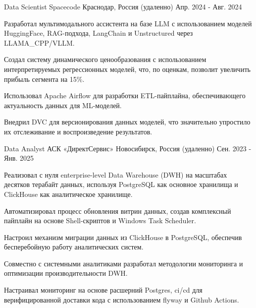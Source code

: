 \begin{cventries}
  \cventry
    {Data Scientist} %
    {Spacecode} %
    {Краснодар, Россия (удаленно)} %
    {Апр. 2024 - Авг. 2024} %
    {
      \begin{cvitems} %
        \item {Разработал мультимодального ассистента на базе LLM с использованием моделей HuggingFace, RAG-подхода, LangChain и Unstructured через LLAMA\_CPP/VLLM.}
        \item {Создал систему динамического ценообразования с использованием интерпретируемых регрессионных моделей, что, по оценкам, позволит увеличить прибыль сегмента на 15\%.}
        \item {Использовал Apache Airflow для разработки ETL-пайплайна, обеспечивающего актуальность данных для ML-моделей.}
        \item {Внедрил DVC для версионирования данных моделей, что значительно упростило их отслеживание и воспроизведение результатов.}
      \end{cvitems}
    }

  \cventry
    {Data Analyst} %
    {АСК «ДиректСервис»} %
    {Новосибирск, Россия (удаленно)} %
    {Сен. 2023 - Янв. 2025} %
    {
      \begin{cvitems} %
        \item {Реализовал с нуля enterprise-level Data Warehouse (DWH) на масштабах десятков терабайт данных, используя PostgreSQL как основное хранилища и ClickHouse как аналитическое хранилище.}
        \item {Автоматизировал процесс обновления витрин данных, создав комплексный пайплайн на основе Shell-скриптов и Windows Task Scheduler.}
        \item {Настроил механизм миграции данных из ClickHouse в PostgreSQL, обеспечив бесперебойную работу аналитических систем.}
        \item {Совместно с системными аналитиками разработал методологии мониторинга и оптимизации производительности DWH.}
        \item {Настраивал мониторинг на основе расшерний Postgres, ci/cd для верифицированной доставки кода с использованием flyway и Github Actions.}
      \end{cvitems}
    }


\end{cventries}
